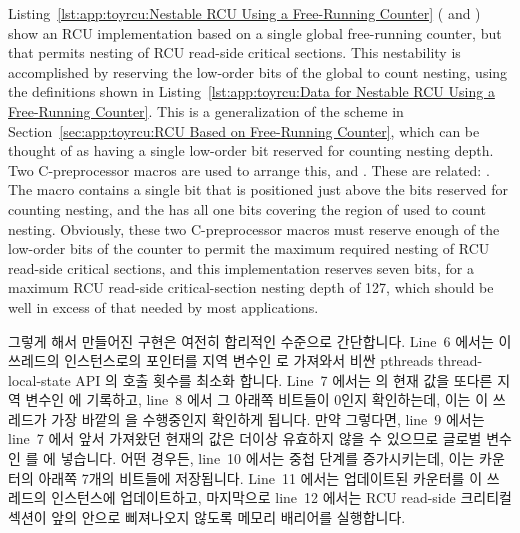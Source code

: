 Listing~\ref{lst:app:toyrcu:Nestable RCU Using a Free-Running Counter}
( and )
show an RCU implementation based on a single global free-running counter,
but that permits nesting of RCU read-side critical sections.
This nestability is accomplished by reserving the low-order bits of the
global  to count nesting, using the definitions shown in
Listing~\ref{lst:app:toyrcu:Data for Nestable RCU Using a Free-Running Counter}.
This is a generalization of the scheme in
Section~\ref{sec:app:toyrcu:RCU Based on Free-Running Counter},
which can be thought of as having a single low-order bit reserved
for counting nesting depth.
Two C-preprocessor macros are used to arrange this,
 and
.
These are related: .
The  macro contains a single bit that is
positioned just above the bits reserved for counting nesting,
and the  has all one bits covering the
region of  used to count nesting.
Obviously, these two C-preprocessor macros must reserve enough
of the low-order bits of the counter to permit the maximum required
nesting of RCU read-side critical sections, and this implementation
reserves seven bits, for a maximum RCU read-side critical-section
nesting depth of 127, which should be well in excess of that needed
by most applications.
\fi

그렇게 해서 만들어진  구현은 여전히 합리적인 수준으로
간단합니다.
Line~6 에서는 이 쓰레드의  인스턴스로의 포인터를 지역 변수인
 로 가져와서 비싼 pthreads thread-local-state API 의 호출 횟수를
최소화 합니다.
Line~7 에서는  의 현재 값을 또다른 지역 변수인  에
기록하고, line~8 에서 그 아래쪽 비트들이 0인지 확인하는데, 이는 이 쓰레드가
가장 바깥의  을 수행중인지 확인하게 됩니다.
만약 그렇다면, line~9 에서는 line~7 에서 앞서 가져왔던 현재의 값은 더이상
유효하지 않을 수 있으므로 글로벌 변수인  를  에
넣습니다.
어떤 경우든, line~10 에서는 중첩 단계를 증가시키는데, 이는 카운터의 아래쪽
7개의 비트들에 저장됩니다.
Line~11 에서는 업데이트된 카운터를 이 쓰레드의  인스턴스에
업데이트하고, 마지막으로 line~12 에서는 RCU read-side 크리티컬 섹션이 앞의
 안으로 삐져나오지 않도록 메모리 배리어를 실행합니다.
\iffalse

